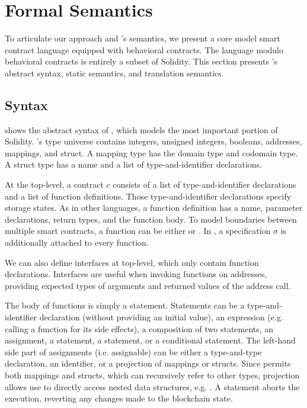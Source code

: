 \section{Formal Semantics} \label{sec:model}

To articulate our approach and \lang's semantics, we present a core model
smart contract language \corelang equipped with
behavioral contracts. The language modulo behavioral
contracts is entirely a subset of Solidity.
This section presents \corelang's abstract syntax, static semantics, and
translation semantics.



\subsection{Syntax}

 shows the abstract syntax of \corelang,
which models the most important portion of Solidity.
\corelang's type universe contains integers, unsigned integers, booleans,
addresses, mappings, and struct.
A mapping type has the domain type and codomain type.
A struct type has a name and a list of type-and-identifier declarations.

At the top-level, a contract $c$ consists of a list of type-and-identifier
declarations and a list of function definitions.
Those type-and-identifier declarations specify storage states.
As in other languages, a function definition has a name, parameter
declarations, return types, and the function body.  To model boundaries between
multiple smart contracts, a function can be either  or
.
In \corelang, a specification $\sigma$ is additionally attached to every function.

We can also define interfaces at top-level, which only contain function
declarations. Interfaces are useful when invoking functions on addresses,
providing expected types of arguments and returned values of the address call.

The body of functions is simply a statement.
Statements can be a type-and-identifier declaration (without providing an initial
value), an expression (e.g. calling a function for its side effects), a
composition of two statements, an assignment, a  statement, a  statement,
or a conditional statement.
The left-hand side part of assignments (i.e. assignable) can be either
a type-and-type declaration, an identifier, or a projection of mappings or structs.
Since \corelang permits both mappings and structs, which can recursively refer to
other types, projection allows use to directly access nested data structures,
e.g. .
A  statement aborts the execution, reverting any changes made to
the blockchain state.

